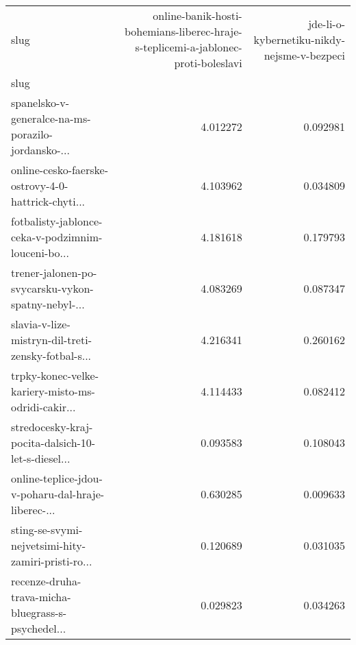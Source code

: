 \begin{tabular}{lrr}
\toprule
slug &  online-banik-hosti-bohemians-liberec-hraje-s-teplicemi-a-jablonec-proti-boleslavi &  jde-li-o-kybernetiku-nikdy-nejsme-v-bezpeci \\
slug                                               &                                                                                    &                                              \\
\midrule
spanelsko-v-generalce-na-ms-porazilo-jordansko-... &                                           4.012272 &                                     0.092981 \\
online-cesko-faerske-ostrovy-4-0-hattrick-chyti... &                                           4.103962 &                                     0.034809 \\
fotbalisty-jablonce-ceka-v-podzimnim-louceni-bo... &                                           4.181618 &                                     0.179793 \\
trener-jalonen-po-svycarsku-vykon-spatny-nebyl-... &                                           4.083269 &                                     0.087347 \\
slavia-v-lize-mistryn-dil-treti-zensky-fotbal-s... &                                           4.216341 &                                     0.260162 \\
trpky-konec-velke-kariery-misto-ms-odridi-cakir... &                                           4.114433 &                                     0.082412 \\
stredocesky-kraj-pocita-dalsich-10-let-s-diesel... &                                           0.093583 &                                     0.108043 \\
online-teplice-jdou-v-poharu-dal-hraje-liberec-... &                                           0.630285 &                                     0.009633 \\
sting-se-svymi-nejvetsimi-hity-zamiri-pristi-ro... &                                           0.120689 &                                     0.031035 \\
recenze-druha-trava-micha-bluegrass-s-psychedel... &                                           0.029823 &                                     0.034263 \\
\bottomrule
\end{tabular}
